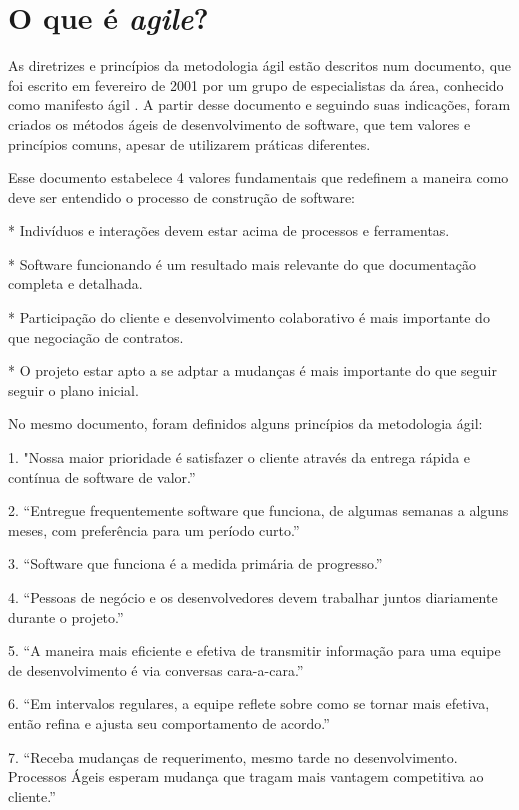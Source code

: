 \documentclass[a4paper,11pt,abntfigtabnum,noindentfirst]{abnt}
\begin{document}
\section {O que é \textsl{agile}?}

As diretrizes e princípios da metodologia ágil estão descritos num documento, que foi escrito em fevereiro de 2001 por um grupo de especialistas da área, conhecido como manifesto ágil . A partir desse documento e seguindo suas indicações, foram criados os métodos ágeis de desenvolvimento de software, que tem valores e princípios comuns, apesar de utilizarem práticas diferentes.

Esse documento estabelece 4 valores fundamentais que redefinem a maneira como deve ser entendido o processo de construção de software:

	* Indivíduos e interações devem estar acima de processos e ferramentas. 

	* Software funcionando é um resultado mais relevante do que documentação completa e detalhada.

	* Participação do cliente e desenvolvimento colaborativo é mais importante do que negociação de contratos.

	* O projeto estar apto a se adptar a mudanças é mais importante do que seguir seguir o plano inicial.

No mesmo documento, foram definidos alguns princípios da metodologia ágil:

   1. "Nossa maior prioridade é satisfazer o cliente através da entrega rápida e contínua de software de valor.''
    
   2. ``Entregue frequentemente software que funciona, de algumas semanas a alguns meses, com preferência para um período curto.''
   
   3. ``Software que funciona é a medida primária de progresso.''

   4. ``Pessoas de negócio e os desenvolvedores devem trabalhar juntos diariamente durante o projeto.''

   5. ``A maneira mais eficiente e efetiva de transmitir informação para uma equipe de desenvolvimento é via conversas cara-a-cara.''

   6. ``Em intervalos regulares, a equipe reflete sobre como se tornar mais efetiva, então refina e ajusta seu comportamento de acordo.''

   7. ``Receba mudanças de requerimento, mesmo tarde no desenvolvimento. Processos Ágeis esperam mudança que tragam mais vantagem competitiva ao cliente.''
\end{document}
